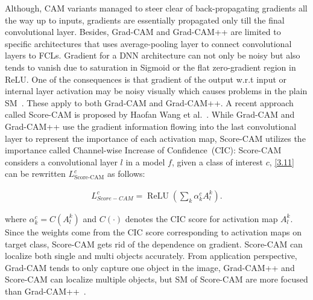 \hspace*{3.5mm} Although, CAM variants managed to steer clear of back-propagating gradients all the way up to inputs, gradients are essentially propagated only till the final convolutional layer. Besides, Grad-CAM and Grad-CAM++ are limited to specific architectures that uses average-pooling layer to connect convolutional layers to FCLs. 
Gradient for a DNN architecture can not only be noisy but also tends to vanish due to saturation in Sigmoid or the flat zero-gradient region in ReLU. One of the consequences is that gradient of the output w.r.t input or internal layer activation may be noisy visually which causes problems in the plain SM~\cite{wang2020score}. 
\hspace*{3.5mm} These apply to both Grad-CAM and Grad-CAM++. A recent approach called Score-CAM is proposed by Haofan Wang et al.~\cite{wang2020score}. While Grad-CAM and Grad-CAM++ use the gradient information flowing into the last convolutional layer to represent the importance of each activation map, Score-CAM utilizes the importance called Channel-wise Increase of Confidence~(CIC): Score-CAM considers a convolutional layer $l$ in a model $f$, given a class of interest $c$, \cref{3.11} can be rewritten $L_{\text {Score-CAM}}^{c}$ as follows: 

\vspace{-4mm}
\begin{align}
    L_{S c o r e-C A M}^{c}=\operatorname{ReLU}\left(\sum_{k} \alpha_{k}^{c} A_{l}^{k}\right).
\end{align}
\vspace{-4mm}

\hspace*{3.5mm} where $\alpha_{k}^{c}=C\left(A_{l}^{k}\right)$ and  $C(\cdot)$ denotes the CIC score for activation map $A_{l}^{k}$. Since the weights come from the CIC score corresponding to activation maps on target class, Score-CAM gets rid of the dependence on gradient. Score-CAM can localize both single and multi objects accurately. From application perspective, Grad-CAM tends to only capture one object in the image, Grad-CAM++ and Score-CAM can localize multiple objects, but SM of Score-CAM are more focused than Grad-CAM++~\cite{wang2020score}.

